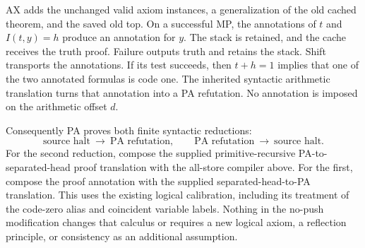 AX adds the unchanged valid axiom instances, a generalization of the old
cached theorem, and the saved old top. On a successful MP, the annotations
of $t$ and $I(t,y)=h$ produce an annotation for $y$. The stack is retained,
and the cache receives the truth proof. Failure outputs truth and retains
the stack. Shift transports the annotations. If its test succeeds, then
$t+h=1$ implies that one of the two annotated formulas is code one.
The inherited syntactic arithmetic translation turns that annotation into
a PA refutation. No annotation is imposed on the arithmetic offset $d$.

Consequently PA proves both finite syntactic reductions:
\[
 \text{source halt}\ \longrightarrow\ \text{PA refutation},
 \qquad
 \text{PA refutation}\ \longrightarrow\ \text{source halt}.
\]
For the second reduction, compose the supplied primitive-recursive
PA-to-separated-head proof translation with the all-store compiler above.
For the first, compose the proof annotation with the supplied
separated-head-to-PA translation. This uses the existing logical calibration,
including its treatment of the code-zero alias and coincident variable
labels. Nothing in the no-push modification changes that calculus or
requires a new logical axiom, a reflection principle, or consistency as
an additional assumption.


